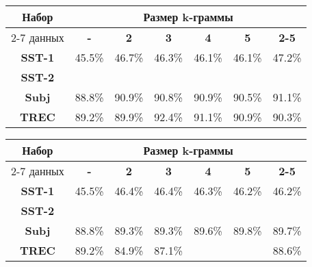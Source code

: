 \vspace{5mm}
\noindent \begin{minipage}{\linewidth}
 \label{tab:title} 
\begin{tabular}{|c|c|c|c|c|c|c|}
\hline
\multirow{2}{*}{Набор}   &                \multicolumn{6}{c|}{Размер k-граммы} \\ \cline{2-7} 
     данных              & \textbf{-}   &   \textbf{2} & \textbf{3} & \textbf{4} & \textbf{5} & \textbf{2-5} \\ \hline
\textbf{SST-1}           & 45.5\%       & 46.7\%       & 46.3\%     & 46.1\%     &  46.1\%    &  47.2\%  \\ \hline
\textbf{SST-2}           &              &              &            &            &            & \\ \hline
\textbf{Subj}            & 88.8\%       & 90.9\%       & 90.8\%     & 90.9\%     &  90.5\%    & 91.1\% \\ \hline
\textbf{TREC}            & 89.2\%       & 89.9\%       & 92.4\%     & 91.1\%     &  90.9\%    & 90.3\% \\ \hline
\end{tabular}
\end{minipage}
\vspace{5mm}

\noindent \begin{minipage}{\linewidth}
 \label{tab:title} 
\begin{tabular}{|c|c|c|c|c|c|c|}
\hline
\multirow{2}{*}{Набор}   &                \multicolumn{6}{c|}{Размер k-граммы} \\ \cline{2-7} 
     данных              & \textbf{-}   &   \textbf{2} & \textbf{3} & \textbf{4} & \textbf{5} & \textbf{2-5} \\ \hline
\textbf{SST-1}           &  45.5\%      & 46.4\%       & 46.4\%     & 46.3\%     &  46.2\%    & 46.2\%           \\  \hline
\textbf{SST-2}           &              &              &            &            &            & \\ \hline
\textbf{Subj}            &  88.8\%      & 89.3\%       & 89.3\%     & 89.6\%     &  89.8\%    & 89.7\% \\ \hline
\textbf{TREC}            &  89.2\%      & 84.9\%       & 87.1\%     &            &            & 88.6\%  \\ \hline
\end{tabular}
\vspace{5mm}
\end{minipage}
\vspace{5mm}

